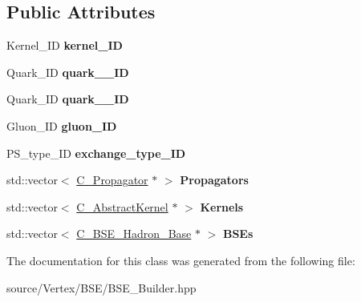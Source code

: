 \subsection*{Public Attributes}
\begin{DoxyCompactItemize}
\item 
\hypertarget{class_c___meson_a300d351aea69188bf790d48643880a27}{Kernel\-\_\-\-I\-D {\bfseries kernel\-\_\-\-I\-D}}\label{class_c___meson_a300d351aea69188bf790d48643880a27}

\item 
\hypertarget{class_c___meson_aec23f4540faa712152b933b6bd4c252e}{Quark\-\_\-\-I\-D {\bfseries quark\-\_\-\_\-\-I\-D}}\label{class_c___meson_aec23f4540faa712152b933b6bd4c252e}

\item 
\hypertarget{class_c___meson_a1e3ab02ec52a316544fc9f5f1be834c7}{Quark\-\_\-\-I\-D {\bfseries quark\-\_\-\_\-\-I\-D}}\label{class_c___meson_a1e3ab02ec52a316544fc9f5f1be834c7}

\item 
\hypertarget{class_c___meson_a43ab30db480af7fadf307b5ce3e8f283}{Gluon\-\_\-\-I\-D {\bfseries gluon\-\_\-\-I\-D}}\label{class_c___meson_a43ab30db480af7fadf307b5ce3e8f283}

\item 
\hypertarget{class_c___meson_a98c581e24aaa3e12ff1f594426c64446}{P\-S\-\_\-type\-\_\-\-I\-D {\bfseries exchange\-\_\-type\-\_\-\-I\-D}}\label{class_c___meson_a98c581e24aaa3e12ff1f594426c64446}

\item 
\hypertarget{class_c___meson_aa2db9e37db36ab471b3b6d863094484e}{std\-::vector$<$ \hyperlink{class_c___propagator}{C\-\_\-\-Propagator} $\ast$ $>$ {\bfseries Propagators}}\label{class_c___meson_aa2db9e37db36ab471b3b6d863094484e}

\item 
\hypertarget{class_c___meson_a5a2cfe858f7a999983e42a42de26cb7d}{std\-::vector$<$ \hyperlink{class_c___abstract_kernel}{C\-\_\-\-Abstract\-Kernel} $\ast$ $>$ {\bfseries Kernels}}\label{class_c___meson_a5a2cfe858f7a999983e42a42de26cb7d}

\item 
\hypertarget{class_c___meson_a98416e65f01449a73e2b12eed01e694a}{std\-::vector$<$ \hyperlink{class_c___b_s_e___hadron___base}{C\-\_\-\-B\-S\-E\-\_\-\-Hadron\-\_\-\-Base} $\ast$ $>$ {\bfseries B\-S\-Es}}\label{class_c___meson_a98416e65f01449a73e2b12eed01e694a}

\end{DoxyCompactItemize}


The documentation for this class was generated from the following file\-:\begin{DoxyCompactItemize}
\item 
source/\-Vertex/\-B\-S\-E/B\-S\-E\-\_\-\-Builder.\-hpp\end{DoxyCompactItemize}
